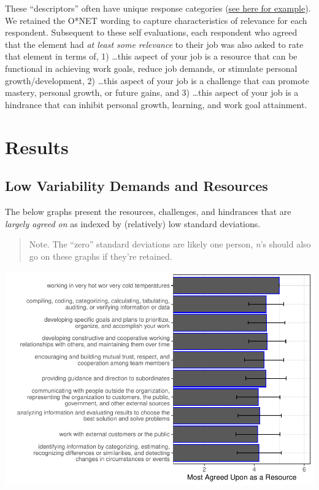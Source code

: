 \documentclass[
  english,
  man]{apa6}
\begin{document}
These ``descriptors'' often have unique response categories (\href{https://www.O*NETonline.org/find/descriptor/result/4.C.1.c.2}{see here for example}). We retained the O*NET wording to capture characteristics of relevance for each respondent. Subsequent to these self evaluations, each respondent who agreed that the element had \emph{at least some relevance} to their job was also asked to rate that element in terms of, 1) \ldots this aspect of your job is a resource that can be functional in achieving work goals, reduce job demands, or stimulate personal growth/development, 2) \ldots this aspect of your job is a challenge that can promote mastery, personal growth, or future gains, and 3) \ldots this aspect of your job is a hindrance that can inhibit personal growth, learning, and work goal attainment.

\hypertarget{results}{%
\section{Results}\label{results}}

\hypertarget{low-variability-demands-and-resources}{%
\subsection{Low Variability Demands and Resources}\label{low-variability-demands-and-resources}}

The below graphs present the resources, challenges, and hindrances that are \emph{largely agreed on} as indexed by (relatively) low standard deviations.

\begin{quote}
Note. The ``zero'' standard deviations are likely one person, \emph{n}'s should also go on these graphs if they're retained.
\end{quote}

\includegraphics{Submission_files/figure-latex/resourceslowsd-1.pdf}
\end{document}
